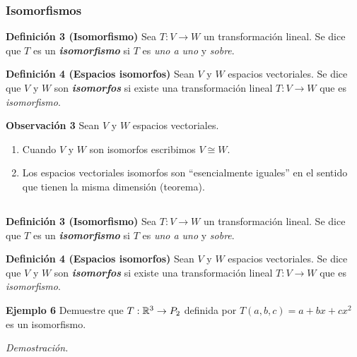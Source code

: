 {\nologo 
\begin{frame}\frametitle{Isomorfismos}
	
	\begin{block}{\textbf{Definición 3 (Isomorfismo) }}
		\justifying
		Sea $T:V\to W$ un  transformación lineal. Se dice que $T$ es un \textbf{\textit{isomorfismo}} si
		$T$ es \textit{uno a uno} y \textit{sobre}.
	\end{block}
	
	\begin{block}{\textbf{Definición 4 (Espacios isomorfos) }}
		\justifying
		Sean $V$ y $W$ espacios vectoriales. Se dice que $V$ y $W$ son \textbf{\textit{isomorfos}} si existe una 
		transformación lineal $T:V\to W$ que es \textit{isomorfismo}.
	\end{block}
	
	\begin{alertblock}{\textbf{Observación 3}}
		Sean $V$ y $W$ espacios vectoriales.
		\begin{enumerate}
			\item[\labelname{$a$}] Cuando $V$ y $W$ son isomorfos escribimos $V\cong W$.
			\item[\labelname{$b$}] Los espacios vectoriales isomorfos son ``esencialmente iguales'' en
			el sentido  que tienen la misma dimensión (teorema).
		\end{enumerate}
	\end{alertblock}	
		
\end{frame}
}


\subsection{}

\begin{frame}%

\begin{block}{\textbf{Definición 3 (Isomorfismo) }}
	\justifying
	Sea $T:V\to W$ un  transformación lineal. Se dice que $T$ es un \textbf{\textit{isomorfismo}} si
	$T$ es \textit{uno a uno} y \textit{sobre}.
\end{block}

\begin{block}{\textbf{Definición 4 (Espacios isomorfos) }}
	\justifying
	Sean $V$ y $W$ espacios vectoriales. Se dice que $V$ y $W$ son \textbf{\textit{isomorfos}} si existe una 
	transformación lineal $T:V\to W$ que es \textit{isomorfismo}.
\end{block}

\begin{ej}{\textbf{Ejemplo 6}}%
	Demuestre que $T:\mathbb{R}^3\to P_2$ definida por $T(a,b,c)=a+bx+cx^2$ es un isomorfismo.
\end{ej}
\textit{Demostración.}
	
\end{frame}

